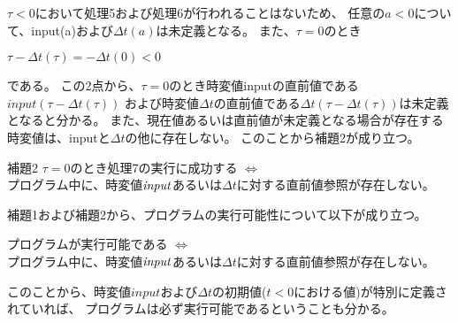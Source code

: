 $\tau < 0$において処理5および処理6が行われることはないため、
任意の$a < 0$について、input(a)および$\Delta t(a)$は未定義となる。
また、$\tau = 0$のとき
\begin{center}
  $\tau - \Delta t(\tau) = -\Delta t(0) < 0$
\end{center}
である。
この2点から、$\tau = 0$のとき時変値inputの直前値である$input(\tau - \Delta t(\tau))$
および時変値$\Delta t$の直前値である$\Delta t(\tau - \Delta t(\tau))$は未定義となると分かる。
また、現在値あるいは直前値が未定義となる場合が存在する時変値は、inputと$\Delta t$の他に存在しない。
このことから補題2が成り立つ。
\begin{itembox}[l]{補題2}
  $\tau = 0$のとき処理7の実行に成功する $\Longleftrightarrow$ \\
  プログラム中に、時変値${\it input}$あるいは$\Delta t$に対する直前値参照が存在しない。
\end{itembox}

補題1および補題2から、プログラムの実行可能性について以下が成り立つ。
\begin{screen}
  プログラムが実行可能である $\Longleftrightarrow$ \\
  プログラム中に、時変値${\it input}$あるいは$\Delta t$に対する直前値参照が存在しない。
\end{screen}

このことから、時変値$input$および$\Delta t$の初期値($t < 0$における値)が特別に定義されていれば、
プログラムは必ず実行可能であるということも分かる。
